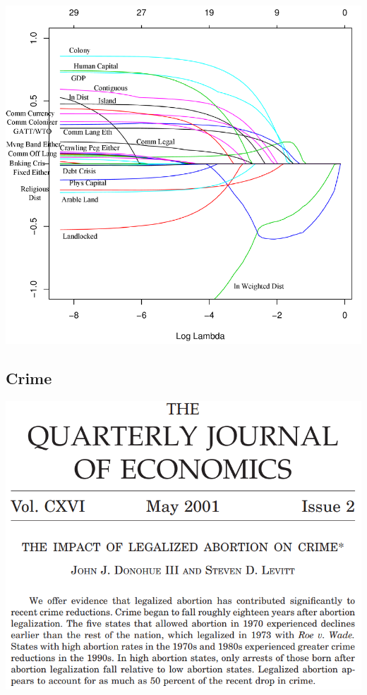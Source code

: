 \begin{frame}
    \vspace{-10pt}
    \begin{center}
    \includegraphics[height=\textheight]{./resources/BaxterLassoPath}
    \end{center}
\end{frame}

\subsection{Crime}

\begin{frame}
    \vspace{-10pt}
    \begin{center}
    \includegraphics[width=\textwidth]{./resources/QJELevitt}
    \end{center}
\end{frame}

